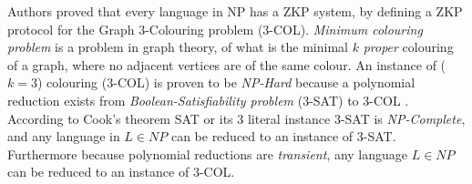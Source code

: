 Authors \cite{GMW} proved that every language in NP has a ZKP system, by defining a ZKP protocol for the Graph 3-Colouring problem (3-COL).
\textit{Minimum colouring problem} is a problem in graph theory, of what is the minimal $k$ \textit{proper} colouring of a graph, where no adjacent vertices are of the same colour.
An instance of ($k=3$) colouring (3-COL) is proven to be \textit{NP-Hard} because a polynomial reduction exists from \textit{Boolean-Satisfiability problem} (3-SAT) to 3-COL \cite{moore2011nature}.
According to Cook's theorem \cite{cook1971complexity} SAT or its 3 literal instance 3-SAT is \textit{NP-Complete}, and any language in $L \in NP$ can be reduced to an instance of 3-SAT. 
Furthermore because polynomial reductions are \textit{transient}, any language $L \in NP$ can be reduced to an instance of 3-COL.

%
%

